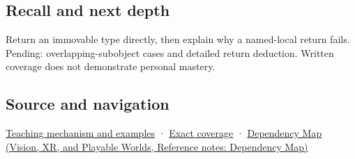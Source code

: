 \subsection{Recall and next depth}\label{appendix-b08d3788c5c6-recall-and-next-depth}

Return an immovable type directly, then explain why a named-local return fails. Pending: overlapping-subobject cases and detailed return deduction. Written coverage does not demonstrate personal mastery.

\subsection{Source and navigation}\label{appendix-b08d3788c5c6-source-and-navigation}

\hyperref[01-foundations-i-ch003-return-a-result-without-handing-out-a-lifetime-problem]{Teaching mechanism and examples} · \hyperref[appendix-fd090d982a15-m009---parts-127-147]{Exact coverage} · \href{../07-Vision-XR-and-Playable-Worlds/main.pdf\#nameddest=appendix-4ad47bdd269a}{Dependency Map (Vision, XR, and Playable Worlds, Reference notes: Dependency Map)}

